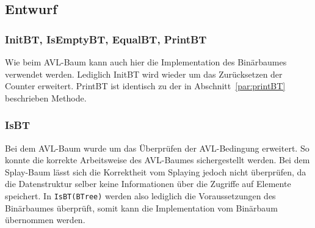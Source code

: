 \subsection{Entwurf}\label{subsec:splay-entwurf}

\subsubsection{InitBT, IsEmptyBT, EqualBT, PrintBT}
Wie beim AVL-Baum kann auch hier die Implementation des Binärbaumes verwendet werden.
Lediglich InitBT wird wieder um das Zurücksetzen der Counter erweitert.
PrintBT ist identisch zu der in Abschnitt~\ref{par:printBT} beschrieben Methode.

\subsubsection{IsBT}
Bei dem AVL-Baum wurde  um das Überprüfen der AVL-Bedingung erweitert.
So konnte die korrekte Arbeitsweise des AVL-Baumes sichergestellt werden.
Bei dem Splay-Baum lässt sich die Korrektheit vom Splaying jedoch nicht überprüfen, da die
Datenstruktur selber keine Informationen über die Zugriffe auf Elemente speichert.
In \verb|IsBT(BTree)| werden also lediglich die Voraussetzungen des Binärbaumes überprüft,
somit kann die Implementation vom Binärbaum übernommen werden.

